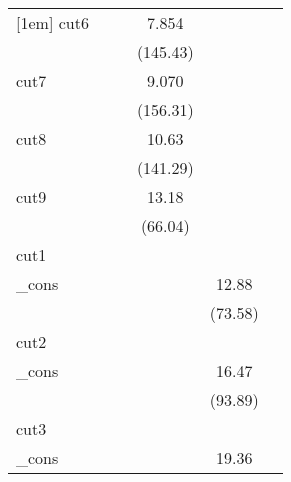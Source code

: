 {\begin{tabular}{l*{5}{c}}
[1em]
cut6        &                     &                     &       7.854\sym{***}&                     &                     \\
            &                     &                     &    (145.43)         &                     &                     \\
[1em]
cut7        &                     &                     &       9.070\sym{***}&                     &                     \\
            &                     &                     &    (156.31)         &                     &                     \\
[1em]
cut8        &                     &                     &       10.63\sym{***}&                     &                     \\
            &                     &                     &    (141.29)         &                     &                     \\
[1em]
cut9        &                     &                     &       13.18\sym{***}&                     &                     \\
            &                     &                     &     (66.04)         &                     &                     \\
\hline
cut1        &                     &                     &                     &                     &                     \\
\_cons      &                     &                     &                     &       12.88\sym{***}&                     \\
            &                     &                     &                     &     (73.58)         &                     \\
\hline
cut2        &                     &                     &                     &                     &                     \\
\_cons      &                     &                     &                     &       16.47\sym{***}&                     \\
            &                     &                     &                     &     (93.89)         &                     \\
\hline
cut3        &                     &                     &                     &                     &                     \\
\_cons      &                     &                     &                     &       19.36\sym{***}&                     \\

\end{tabular}}
